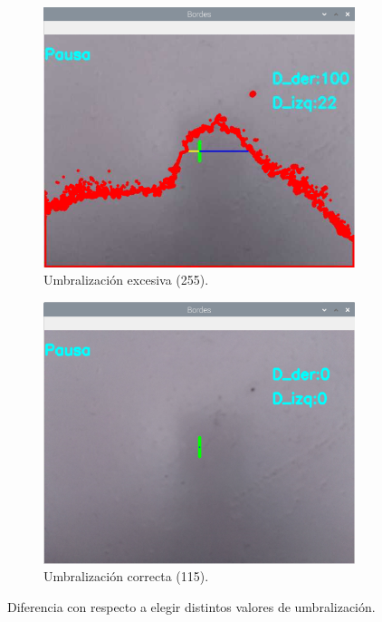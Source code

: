 \documentclass[11pt,a4paper]{article}
\begin{document}
	\begin{figure}[h!]
		\centering
		\begin{subfigure}{0.47\textwidth}
			\includegraphics[width=\textwidth]{imagenes/captura_ruido.png}
			\caption{Umbralización excesiva (255).}
			\label{fig:captura_ruido}
		\end{subfigure}
		\hfill
		\begin{subfigure}{0.47\textwidth}
			\includegraphics[width=\textwidth]{imagenes/captura_sin_ruido.png}
			\caption{Umbralización correcta (115).}
			\label{fig:captura_sin_ruido}
		\end{subfigure}
		\caption{Diferencia con respecto a elegir distintos valores de umbralización.}
		\label{fig:captura}
	\end{figure}
	
\end{document}
